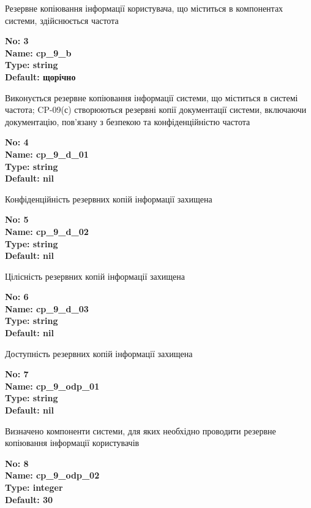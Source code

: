 \documentclass{article}
\begin{document}
{\footnotesize Резервне копіювання інформації користувача, що міститься в компонентах системи, здійснюється частота}


{\footnotesize\bfseries
No: 3\\
Name: cp\_\allowbreak{}9\_\allowbreak{}b\\
Type: string\\
Default: \textquotedbl{}щорічно\textquotedbl{}
}

{\footnotesize Виконується резервне копіювання інформації системи, що міститься в системі частота; CP-09(с) створюються резервні копії документації системи, включаючи документацію, пов'язану з безпекою та конфіденційністю частота}


{\footnotesize\bfseries
No: 4\\
Name: cp\_\allowbreak{}9\_\allowbreak{}d\_\allowbreak{}01\\
Type: string\\
Default: nil
}

{\footnotesize Конфіденційність резервних копій інформації захищена}


{\footnotesize\bfseries
No: 5\\
Name: cp\_\allowbreak{}9\_\allowbreak{}d\_\allowbreak{}02\\
Type: string\\
Default: nil
}

{\footnotesize Цілісність резервних копій інформації захищена}


{\footnotesize\bfseries
No: 6\\
Name: cp\_\allowbreak{}9\_\allowbreak{}d\_\allowbreak{}03\\
Type: string\\
Default: nil
}

{\footnotesize Доступність резервних копій інформації захищена}


{\footnotesize\bfseries
No: 7\\
Name: cp\_\allowbreak{}9\_\allowbreak{}odp\_\allowbreak{}01\\
Type: string\\
Default: nil
}

{\footnotesize Визначено компоненти системи, для яких необхідно проводити резервне копіювання інформації користувачів}


{\footnotesize\bfseries
No: 8\\
Name: cp\_\allowbreak{}9\_\allowbreak{}odp\_\allowbreak{}02\\
Type: integer\\
Default: 30
}
\end{document}
